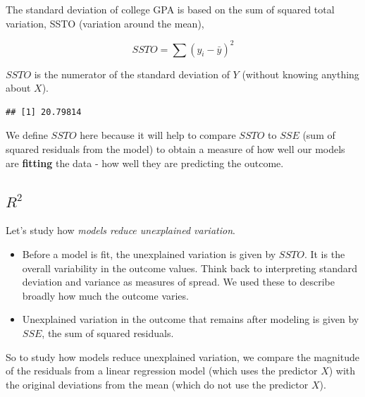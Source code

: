 \documentclass[
]{book}
\newenvironment{Shaded}{\begin{snugshade}}{\end{snugshade}}
\newcommand{\DataTypeTok}[1]{\textcolor[rgb]{0.13,0.29,0.53}{#1}}
\newcommand{\DecValTok}[1]{\textcolor[rgb]{0.00,0.00,0.81}{#1}}
\newcommand{\KeywordTok}[1]{\textcolor[rgb]{0.13,0.29,0.53}{\textbf{#1}}}
\newcommand{\NormalTok}[1]{#1}
\newcommand{\OperatorTok}[1]{\textcolor[rgb]{0.81,0.36,0.00}{\textbf{#1}}}
\newcommand{\StringTok}[1]{\textcolor[rgb]{0.31,0.60,0.02}{#1}}
\providecommand{\tightlist}{%
  \setlength{\itemsep}{0pt}\setlength{\parskip}{0pt}}
\begin{document}
The standard deviation of college GPA is based on the sum of squared total variation, SSTO (variation around the mean),

\[ SSTO = \sum{(y_i -\bar{y})^2} \]

\(SSTO\) is the numerator of the standard deviation of \(Y\) (without knowing anything about \(X\)).

\begin{Shaded}
\end{Shaded}

\begin{verbatim}
## [1] 20.79814
\end{verbatim}

We define \(SSTO\) here because it will help to compare \(SSTO\) to \(SSE\) (sum of squared residuals from the model) to obtain a measure of how well our models are \textbf{fitting} the data - how well they are predicting the outcome.

\hypertarget{r2}{%
\subsection{\texorpdfstring{\(R^2\)}{R\^{}2}}\label{r2}}

Let's study how \emph{models reduce unexplained variation}.

\begin{itemize}
\tightlist
\item
  Before a model is fit, the unexplained variation is given by \(SSTO\). It is the overall variability in the outcome values. Think back to interpreting standard deviation and variance as measures of spread. We used these to describe broadly how much the outcome varies.
\item
  Unexplained variation in the outcome that remains after modeling is given by \(SSE\), the sum of squared residuals.
\end{itemize}

So to study how models reduce unexplained variation, we compare the magnitude of the residuals from a linear regression model (which uses the predictor \(X\)) with the original deviations from the mean (which do not use the predictor \(X\)).
\end{document}
